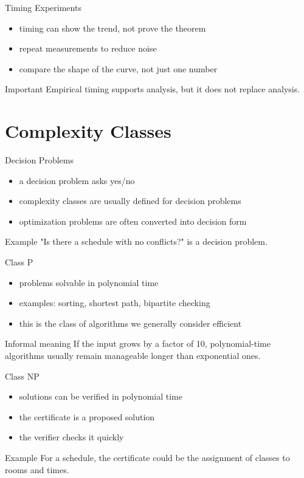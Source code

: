 \documentclass[aspectratio=169,xcolor=dvipsnames]{beamer}
\begin{document}
\begin{frame}{Timing Experiments}
  \begin{itemize}
    \item timing can show the trend, not prove the theorem
    \item repeat measurements to reduce noise
    \item compare the shape of the curve, not just one number
  \end{itemize}
  \begin{alertblock}{Important}
    Empirical timing supports analysis, but it does not replace analysis.
  \end{alertblock}
\end{frame}

\section{Complexity Classes}
\begin{frame}{Decision Problems}
  \begin{itemize}
    \item a decision problem asks yes/no
    \item complexity classes are usually defined for decision problems
    \item optimization problems are often converted into decision form
  \end{itemize}
  \begin{block}{Example}
    "Is there a schedule with no conflicts?" is a decision problem.
  \end{block}
\end{frame}

\begin{frame}{Class P}
  \begin{itemize}
    \item problems solvable in polynomial time
    \item examples: sorting, shortest path, bipartite checking
    \item this is the class of algorithms we generally consider efficient
  \end{itemize}
  \begin{exampleblock}{Informal meaning}
    If the input grows by a factor of 10, polynomial-time algorithms usually remain manageable longer than exponential ones.
  \end{exampleblock}
\end{frame}

\begin{frame}{Class NP}
  \begin{itemize}
    \item solutions can be verified in polynomial time
    \item the certificate is a proposed solution
    \item the verifier checks it quickly
  \end{itemize}
  \begin{block}{Example}
    For a schedule, the certificate could be the assignment of classes to rooms and times.
  \end{block}
\end{frame}
\end{document}
